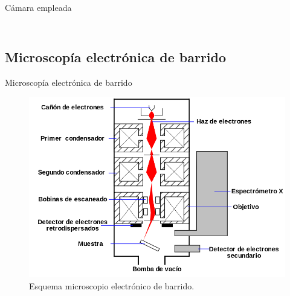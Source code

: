 \documentclass[11pt]{beamer}
\begin{document}
\begin{frame}{Cámara empleada}
\begin{columns}[T]
\begin{column}{.49\textwidth}
\begin{figure}[H]
					\end{figure}
				\end{column}
			\end{columns}
		\end{frame}
	
	\subsection{Microscopía electrónica de barrido}
		\begin{frame}{Microscopía electrónica de barrido}
			\begin{figure}[H]
				\centering
				\includegraphics[scale=0.25]{img/SEM.png}
				\caption*{Esquema microscopio electrónico de barrido.}
			\end{figure}
		\end{frame}
		
\end{document}

